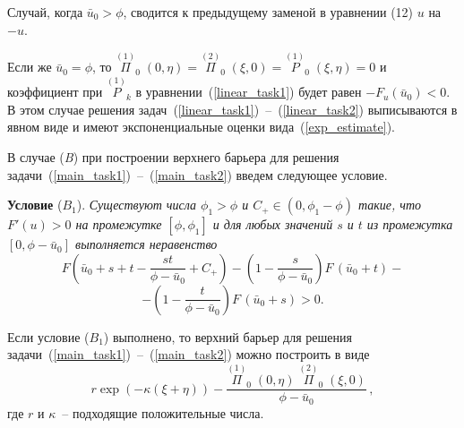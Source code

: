 \documentclass[12pt]{article}
\begin{document}
Случай, когда $\bar u_0 > \phi$, сводится к предыдущему заменой в уравнении (12) $u$ на $-u$.

Если же $\bar u_0 = \phi$, то $\overset{(1)}{\Pi}_0 \; (0, \eta) = \overset{(2)}{\Pi}_0 \; (\xi, 0) = \overset{(1)}{P}_0 \; (\xi, \eta) = 0$ и коэффициент при $\overset{(1)}{P}_k$ в уравнении~(\ref {linear_task1}) будет равен $-F_u(\bar u_0) < 0$. В этом случае решения задач~(\ref {linear_task1})~--~(\ref {linear_task2}) выписываются в явном виде и имеют экспоненциальные оценки вида~(\ref{exp_estimate}).

В случае (\textit{B}) при построении верхнего барьера для решения задачи~(\ref {main_task1})~--~(\ref {main_task2}) введем следующее условие.

{\bf Условие} (\textit{$B_1$}). 
\textit{ Существуют числа $\phi_1 > \phi$ и $C_+ \in (0, \phi_1 - \phi)$ такие, что $F'(u) > 0$ на промежутке $[\phi, \phi_1]$ и для любых значений $s$ и $t$ из промежутка $[0, \phi - \bar u_0]$ выполняется неравенство
\begin{equation*}
	F \left( \bar u_0 + s + t - \frac{s t}{\phi - \bar u_0} + C_+ \right) - \left( 1 - \frac{s}{\phi - \bar u_0} \right)
F \, (\bar u_0 + t) -
\end{equation*}
\begin{equation} \label {F_eq}
	- \left( 1 - \frac{t}{\phi - \bar u_0} \right) F \, (\bar u_0 + s) > 0. 
\end{equation}
}

Если условие (\textit{$B_1$}) выполнено, то верхний барьер для решения задачи~(\ref {main_task1})~--~(\ref {main_task2}) можно построить в виде
\begin{equation} \label {last}
	r \exp (-\kappa (\xi + \eta)) -
\frac{\overset{(1)}{\Pi}_0 \; (0, \eta) \; \overset{(2)}{\Pi}_0 \; (\xi, 0)}{\phi - \bar u_0} \, ,
\end{equation}
где $r$ и $\kappa$~-- подходящие положительные числа.
\end{document}
